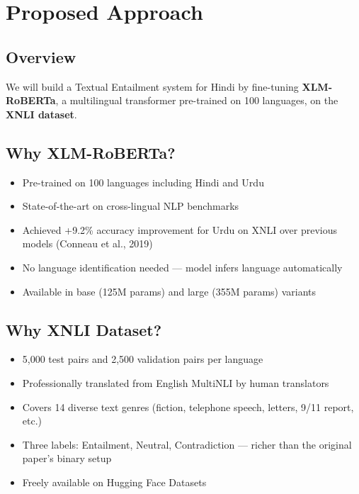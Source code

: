 \section{Proposed Approach}

\subsection{Overview}

We will build a Textual Entailment system for Hindi by fine-tuning \textbf{XLM-RoBERTa}, a multilingual transformer pre-trained on 100 languages, on the \textbf{XNLI dataset}.

\subsection{Why XLM-RoBERTa?}

\begin{itemize}[nosep]
    \item Pre-trained on 100 languages including Hindi and Urdu
    \item State-of-the-art on cross-lingual NLP benchmarks
    \item Achieved +9.2\% accuracy improvement for Urdu on XNLI over previous models (Conneau et al., 2019)
    \item No language identification needed --- model infers language automatically
    \item Available in base (125M params) and large (355M params) variants
\end{itemize}

\subsection{Why XNLI Dataset?}

\begin{itemize}[nosep]
    \item 5,000 test pairs and 2,500 validation pairs per language
    \item Professionally translated from English MultiNLI by human translators
    \item Covers 14 diverse text genres (fiction, telephone speech, letters, 9/11 report, etc.)
    \item Three labels: Entailment, Neutral, Contradiction --- richer than the original paper's binary setup
    \item Freely available on Hugging Face Datasets
\end{itemize}
